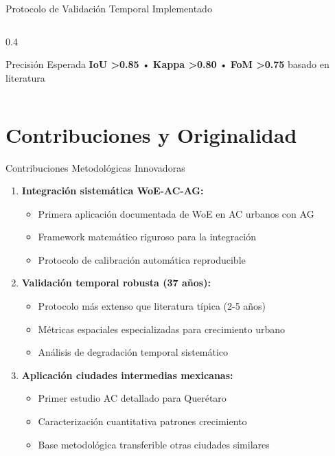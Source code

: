 \documentclass[aspectratio=169]{beamer}
\begin{document}
\begin{frame}{Protocolo de Validación Temporal Implementado}
\begin{columns}
\begin{column}{0.4\textwidth}
      \vspace{0.3cm}
      \begin{alertblock}{Precisión Esperada}
      \textbf{IoU >0.85} • \textbf{Kappa >0.80} • 
      \textbf{FoM >0.75} basado en literatura
      \end{alertblock}
    \end{column}
  \end{columns}
\end{frame}

\section{Contribuciones y Originalidad}

\begin{frame}{Contribuciones Metodológicas Innovadoras}
  \begin{enumerate}
    \item \textbf{Integración sistemática WoE-AC-AG:}
    \begin{itemize}
      \item Primera aplicación documentada de WoE en AC urbanos con AG
      \item Framework matemático riguroso para la integración
      \item Protocolo de calibración automática reproducible
    \end{itemize}
    
    \item \textbf{Validación temporal robusta (37 años):}
    \begin{itemize}
      \item Protocolo más extenso que literatura típica (2-5 años)
      \item Métricas espaciales especializadas para crecimiento urbano
      \item Análisis de degradación temporal sistemático
    \end{itemize}
    
    \item \textbf{Aplicación ciudades intermedias mexicanas:}
    \begin{itemize}
      \item Primer estudio AC detallado para Querétaro  
      \item Caracterización cuantitativa patrones crecimiento
      \item Base metodológica transferible otras ciudades similares
    \end{itemize}
  \end{enumerate}
\end{frame}
\end{document}
